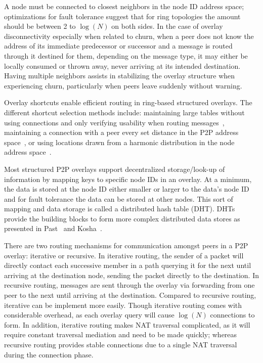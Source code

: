 A node must be connected to closest neighbors in the node ID address space;
optimizations for fault tolerance suggest that for ring topologies the amount
should be between 2 to $\log(N)$ on both sides.  In the case of overlay
disconnectivity especially when related to churn, when a peer does not know the
address of its immediate predecessor or successor and a message is routed
through it destined for them, depending on the message type, it may either be
locally consumed or thrown away, never arriving at its intended destination.
Having multiple neighbors assists in stabilizing the overlay structure when
experiencing churn, particularly when peers leave suddenly without warning.

Overlay shortcuts enable efficient routing in ring-based structured overlays.
The different shortcut selection methods include: maintaining large tables
without using connections and only verifying usability when routing
messages~\cite{pastry, kademlia}, maintaining a connection with a peer every
set distance in the P2P address space~\cite{chord}, or using locations drawn
from a harmonic distribution in the node address space~\cite{symphony}.

Most structured P2P overlays support decentralized storage/look-up of
information by mapping keys to specific node IDs in an overlay.  At a
minimum, the data is stored at the node ID either smaller or larger to the
data's node ID and for fault tolerance the data can be stored at other nodes.
This sort of mapping and data storage is called a distributed hash table (DHT).
DHTs provide the building blocks to form more complex distributed data stores
as presented in Past~\cite{past} and Kosha~\cite{kosha}.

There are two routing mechanisms for communication amongst peers in a
P2P overlay: iterative or recursive.  In iterative routing, the sender of a
packet will directly contact each successive member in a path querying it for
the next until arriving at the destination node, sending the packet directly to
the destination.  In recursive routing, messages are sent through the overlay
via forwarding from one peer to the next until arriving at the destination.
Compared to recursive routing, iterative can be implement more easily.  Though
iterative routing comes with considerable overhead, as each overlay query will
cause $\log(N)$ connections to form.  In addition, iterative routing makes NAT
traversal complicated, as it will require constant traversal mediation and need
to be made quickly; whereas recursive routing provides stable connections due
to a single NAT traversal during the connection phase.

